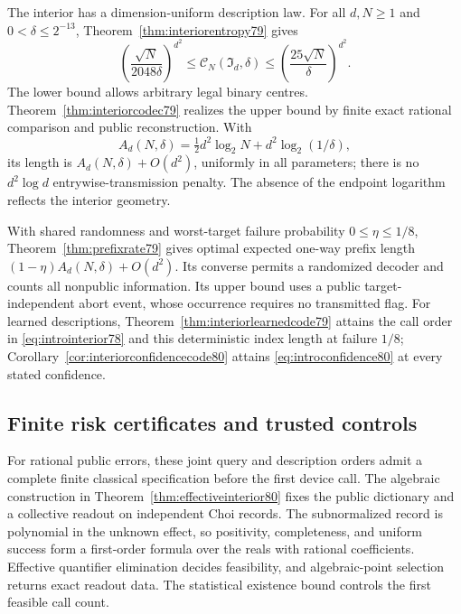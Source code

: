 The interior has a dimension-uniform description law.  For all
$d,N\ge1$ and $0<\delta\le2^{-13}$,
Theorem~\ref{thm:interiorentropy79} gives
\begin{equation}\label{eq:introinteriorentropy79}
 \left(\frac{\sqrt N}{2048\delta}\right)^{d^2}
 \le\mathcal C_N(\mathfrak I_d,\delta)
 \le\left(\frac{25\sqrt N}{\delta}\right)^{d^2}.
\end{equation}
The lower bound allows arbitrary legal binary centres.
Theorem~\ref{thm:interiorcodec79} realizes the upper bound by
finite exact rational comparison and public reconstruction.  With
\[
 A_d(N,\delta)=\tfrac12d^2\log_2N+d^2\log_2(1/\delta),
\]
its length is $A_d(N,\delta)+O(d^2)$, uniformly in all parameters;
there is no $d^2\log d$ entrywise-transmission penalty.  The
absence of the endpoint logarithm reflects the interior geometry.

With shared randomness and worst-target failure probability
$0\le\eta\le1/8$, Theorem~\ref{thm:prefixrate79} gives optimal
expected one-way prefix length
$(1-\eta)A_d(N,\delta)+O(d^2)$.  Its converse permits a
randomized decoder and counts all nonpublic information.  Its
upper bound uses a public target-independent abort event, whose
occurrence requires no transmitted flag.  For learned descriptions,
Theorem~\ref{thm:interiorlearnedcode79} attains the call order
in \eqref{eq:introinterior78} and this deterministic index length
at failure $1/8$; Corollary~\ref{cor:interiorconfidencecode80}
attains \eqref{eq:introconfidence80} at every stated confidence.

\subsection{Finite risk certificates and trusted controls}
For rational public errors, these joint query and description
orders admit a complete finite classical specification before the
first device call.  The algebraic construction in
Theorem~\ref{thm:effectiveinterior80} fixes the public dictionary
and a collective readout on independent Choi records.  The
subnormalized record is polynomial in the unknown effect, so
positivity, completeness, and uniform success form a first-order
formula over the reals with rational coefficients.  Effective
quantifier elimination decides feasibility, and algebraic-point
selection returns exact readout data.  The statistical existence
bound controls the first feasible call count.

